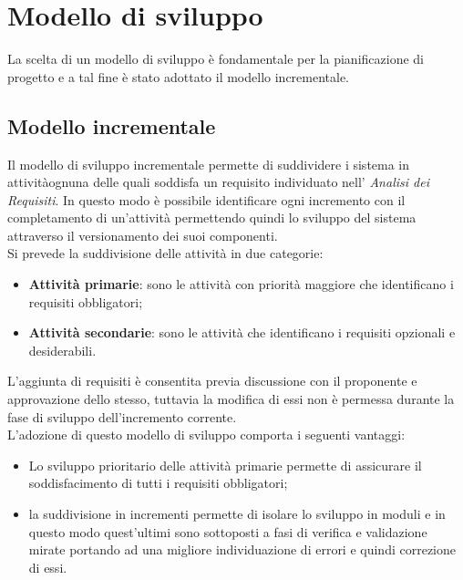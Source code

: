 \section{Modello di sviluppo}
La scelta di un modello di sviluppo è fondamentale per la pianificazione di 
progetto e a tal fine è stato adottato il modello incrementale.
\subsection{Modello incrementale}
Il modello di sviluppo incrementale permette di suddividere i sistema in 
attività\glosp ognuna delle quali soddisfa un requisito\glosp 
individuato nell' \textit{Analisi dei Requisiti}. In questo modo è possibile 
identificare ogni incremento con il completamento di un'attività permettendo 
quindi lo sviluppo del sistema attraverso il versionamento dei suoi componenti. 
\\
Si prevede la suddivisione delle attività in due categorie: 
\begin{itemize}
	\item \textbf{Attività primarie}: sono le attività con priorità maggiore 
	che identificano i requisiti obbligatori;
	\item \textbf{Attività secondarie}: sono le attività che identificano i 
	requisiti opzionali e desiderabili.
\end{itemize}
L'aggiunta di requisiti è consentita previa discussione con il proponente e 
approvazione dello stesso, tuttavia la modifica di essi non è permessa 
durante la fase di sviluppo dell'incremento corrente.\\
L'adozione di questo modello di sviluppo comporta i seguenti vantaggi:
\begin{itemize}
	\item Lo sviluppo prioritario delle attività primarie permette di 
	assicurare il soddisfacimento di tutti i requisiti obbligatori;
	\item la suddivisione in incrementi permette di isolare lo sviluppo in 
	moduli e in questo modo quest'ultimi sono sottoposti a fasi di verifica e 
	validazione mirate portando ad una migliore individuazione di errori e 
	quindi correzione di essi.
\end{itemize}

